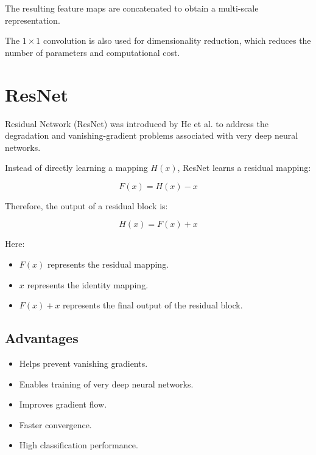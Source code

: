 \documentclass[12pt,a4paper]{article}
\begin{document}
The resulting feature maps are concatenated to obtain a multi-scale representation.

The $1\times1$ convolution is also used for dimensionality reduction, which reduces the number of parameters and computational cost.


\section{ResNet}

Residual Network (ResNet) was introduced by He et al. to address the degradation and vanishing-gradient problems associated with very deep neural networks.

Instead of directly learning a mapping $H(x)$, ResNet learns a residual mapping:

\begin{equation}
F(x) = H(x) - x
\end{equation}

Therefore, the output of a residual block is:

\begin{equation}
H(x) = F(x) + x
\end{equation}

Here:

\begin{itemize}
    \item $F(x)$ represents the residual mapping.
    \item $x$ represents the identity mapping.
    \item $F(x)+x$ represents the final output of the residual block.
\end{itemize}

\subsection{Advantages}

\begin{itemize}
    \item Helps prevent vanishing gradients.
    \item Enables training of very deep neural networks.
    \item Improves gradient flow.
    \item Faster convergence.
    \item High classification performance.
\end{itemize}
\end{document}
